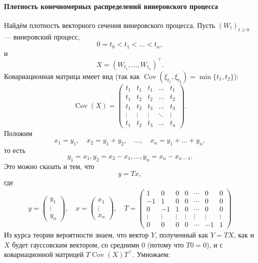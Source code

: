 \documentclass[10pt]{article}
\theoremstyle{boldnormal}
\theoremstyle{boldremark}
\begin{document}
\paragraph{Плотность конечномерных распределений винеровского процесса} 
Найдём плотность векторного сечения винеровского процесса.
Пусть $(W_t)_{t \geq 0}$ --- винеровский процесс,
\[
0=t_0<t_1<\dots<t_n,
\]
и
\[
X=(W_{t_1},\dots,W_{t_n})^{\intercal}.
\]
Ковариационная матрица имеет вид
(так как $\operatorname{Cov}(\xi_{t_1}, \xi_{t_2})
= \min\{t_1, t_2\}$):
\[
\operatorname{Cov}(X)=
\begin{pmatrix}
t_1 & t_1 & t_1 & \dots & t_1 \\
t_1 & t_2 & t_2 & \dots & t_2 \\
t_1 & t_2 & t_3 & \dots & t_3 \\
\vdots & \vdots & \vdots & \ddots & \vdots \\
t_1 & t_2 & t_3 & \dots & t_n
\end{pmatrix}.
\]
Положим
\[
x_1=y_1,\quad
x_2=y_1+y_2,\quad
\dots,\quad
x_n=y_1+\dots+y_n,
\]
то есть
\[
y_1 = x_1, y_2 = x_2 - x_1, \ldots, y_n = x_n - x_{n-1}.
\]
Это можно сказать и тем, что 
\[
y= Tx,
\]
где
{\small 
\begin{align*}
y = \begin{pmatrix} y_1 \\ \vdots \\ y_n \end{pmatrix},
\quad 
x = \begin{pmatrix} x_1 \\ \vdots \\ x_n \end{pmatrix},
\quad 
T = 
\begin{pmatrix}
1 & 0 & 0 & 0 & \cdots & 0 & 0 
\\
-1 & 1 & 0 & 0 & \cdots & 0 & 0
\\
0 & -1 & 1 & 0 & \cdots & 0 & 0
\\
\vdots & \vdots & \vdots & \vdots & \vdots & \vdots & \vdots 
\\
0 & 0 & 0 & 0 & \cdots & -1 & 1
\end{pmatrix}
\end{align*}
}
Из курса теории вероятности знаем, что 
вектор \(Y\), полученный как 
\(Y= TX\), как и \(X\) будет 
гауссовским вектором, со
средними \(0\) (потому что \(T0 = 0\)),
и с ковариационной матрицей 
\(T\operatorname{Cov}(X)T^{\intercal}\).
Умножаем:
\end{document}
